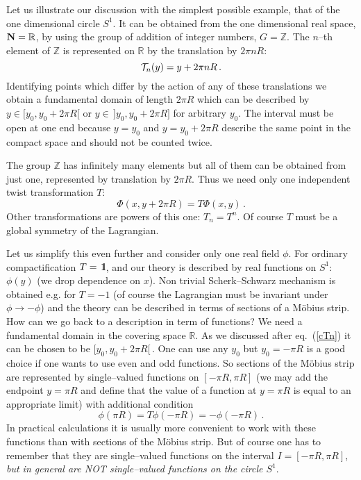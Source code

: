 \documentclass[a4paper,12pt]{article}
\def\cT{{\cal T}}
\def\bN{{\bf N}}
\def\RR{\mathbb R}
\def\ZZ{\mathbb Z}
\def\id{{\,\,{\rm l}\!\!\!1}}
\begin{document}
Let us illustrate our discussion with the simplest possible example,
that of the one dimensional circle $S^1$. 
It can be obtained from the one dimensional real space, $\bN=\RR$, by
using the group of addition of integer numbers, $G=\ZZ$. The $n$--th
element of $\ZZ$ is represented on $\RR$ by the translation by 
$2\pi nR$:
\begin{equation}
\cT_n(y)=y+2\pi nR
\,.
\label{cTn}
\end{equation}
Identifying points which differ by the action of any of these
translations we obtain a fundamental domain of length $2\pi R$ which
can be described by $y\in [y_0,y_0+2\pi R[$ or 
$y\in\,]y_0,y_0+2\pi R]$ 
for arbitrary $y_0$. The interval must be open at one end because
$y=y_0$ and $y=y_0+2\pi R$ describe the same point in the compact
space and should not be counted twice. 


The group $\ZZ$ has infinitely many elements but all of them can be
obtained from just one, represented by translation by $2\pi R$. Thus
we need only one independent twist transformation $T$:
\begin{equation}
\Phi(x,y+2\pi R)= T\Phi(x,y)
\,.
\end{equation}
Other transformations are powers of this one: $T_n=T^n$.
Of course $T$ must be a global symmetry of the Lagrangian.


Let us simplify this even further and consider only one real field 
$\phi$. For ordinary compactification $T=\id$, and our theory is
described by real functions on $S^1$: $\phi(y)$ (we drop dependence on
$x$). Non trivial Scherk--Schwarz mechanism is 
obtained e.g. for $T=-1$ (of course 
the Lagrangian must be invariant under $\phi\to-\phi$) and the theory 
can be described in terms of sections of a M\"obius strip.
How can we go back to a description in term of functions?
We need a fundamental domain in the covering space $\RR$.
As we discussed after eq.\ (\ref{cTn}) it can be chosen to be 
$[y_0,y_0+2\pi R[\,$. One can use any $y_0$ but $y_0=-\pi R$ is a
good choice if one wants to use even and odd functions. 
So sections of the
M\"obius strip are represented by single--valued functions on
$[-\pi R,\pi R]$
(we may add the endpoint $y=\pi R$ and define that the value of a
function at $y=\pi R$ is equal to an appropriate limit) 
with additional condition
\begin{equation}
\phi(\pi R)=T\phi(-\pi R) = -\phi(-\pi R)
\,.
\end{equation}
In practical calculations it is usually more convenient to work with
these functions than with sections of the M\"obius strip.
But of course one has to remember that they are single--valued
functions on the interval $I=[-\pi R, \pi R]$, 
{\it but in general are NOT single--valued functions on the circle
$S^1$}.  
\end{document}

